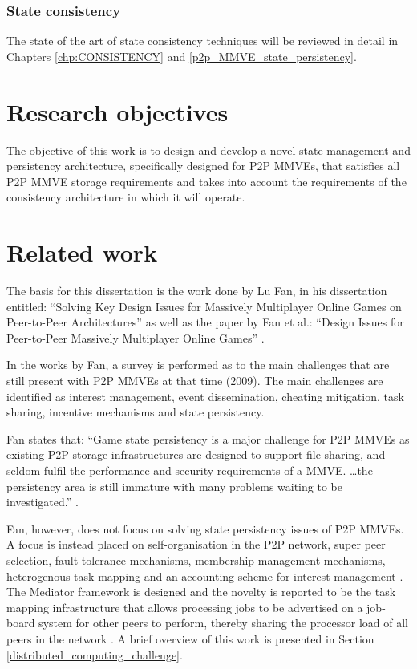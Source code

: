 \subsubsection{State consistency}

The state of the art of state consistency techniques will be reviewed in detail in Chapters \ref{chp:CONSISTENCY} and \ref{p2p_MMVE_state_persistency}.

\section{Research objectives}

The objective of this work is to design and develop a novel state management and persistency architecture, specifically designed for P2P MMVEs, that satisfies all P2P MMVE storage requirements and takes into account the requirements of the consistency architecture in which it will operate.

\section{Related work}

The basis for this dissertation is the work done by Lu Fan, in his dissertation entitled: ``Solving Key Design Issues for Massively Multiplayer Online Games on Peer-to-Peer Architectures'' \cite{Fan_phd} as well as the paper by Fan et al.: ``Design Issues for Peer-to-Peer Massively Multiplayer Online Games'' \cite{Fan_deisgn_issues_p2p}.

In the works by Fan, a survey is performed as to the main challenges that are still present with P2P MMVEs at that time (2009). The main challenges are identified as interest management, event dissemination, cheating mitigation, task sharing, incentive mechanisms and state persistency.

Fan states that: ``Game state persistency is a major challenge for P2P MMVEs as existing P2P storage infrastructures are designed to support file sharing, and seldom fulfil the performance and security requirements of a MMVE. \ldots the persistency area is still immature with many problems waiting to be investigated.'' \cite{Fan_phd}.

Fan, however, does not focus on solving state persistency issues of P2P MMVEs. A focus is instead placed on self-organisation in the P2P network, super peer selection, fault tolerance mechanisms, membership management mechanisms, heterogenous task mapping and an accounting scheme for interest management \cite{Fan_phd}. The Mediator framework is designed and the novelty is reported to be the task mapping infrastructure that allows processing jobs to be advertised on a job-board system for other peers to perform, thereby sharing the processor load of all peers in the network \cite{fan_mediator_paper}. A brief overview of this work is presented in Section \ref{distributed_computing_challenge}.

